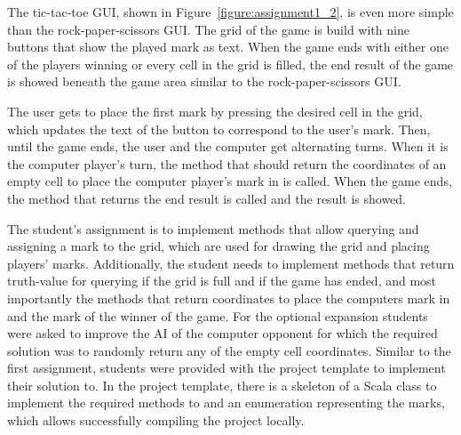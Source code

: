 The tic-tac-toe GUI, shown in Figure~\ref{figure:assignment1_2}, is even more simple than the rock-paper-scissors GUI. The grid of the game is build with nine buttons that show the played mark as text. When the game ends with either one of the players winning or every cell in the grid is filled, the end result of the game is showed beneath the game area similar to the rock-paper-scissors GUI.

The user gets to place the first mark by pressing the desired cell in the grid, which updates the text of the button to correspond to the user's mark. Then, until the game ends, the user and the computer get alternating turns. When it is the computer player's turn, the method that should return the coordinates of an empty cell to place the computer player's mark in is called. When the game ends, the method that returns the end result is called and the result is showed.

The student's assignment is to implement methods that allow querying and assigning a mark to the grid, which are used for drawing the grid and placing players' marks. Additionally, the student needs to implement methods that return truth-value for querying if the grid is full and if the game has ended, and most importantly the methods that return coordinates to place the computers mark in and the mark of the winner of the game. For the optional expansion students were asked to improve the AI of the computer opponent for which the required solution was to randomly return any of the empty cell coordinates. Similar to the first assignment, students were provided with the project template to implement their solution to. In the project template, there is a skeleton of a Scala class to implement the required methods to and an enumeration representing the marks, which allows successfully compiling the project locally.

